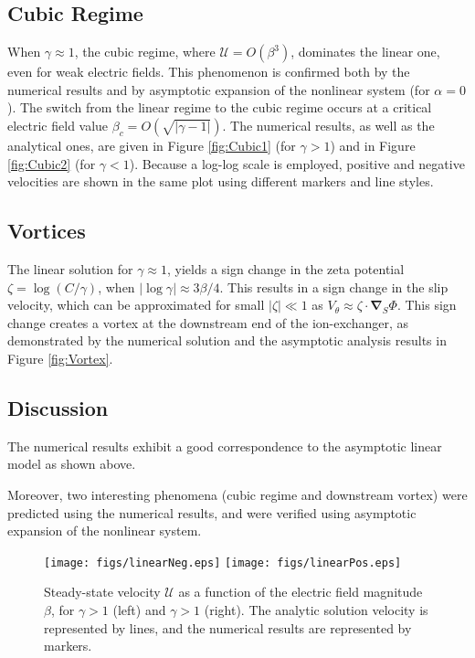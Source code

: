 \documentclass[10pt]{ijnam}
\newcommand\bnabla{\boldsymbol{\nabla}}
\newcommand\cU{\mathscr{U}}
\begin{document}
\subsection{Cubic Regime}
When $\gamma \approx 1$, the cubic regime, where $\cU = O(\beta^3)$, 
dominates the linear one, even for weak electric fields. 
This phenomenon is confirmed both by the numerical
results and by asymptotic expansion of the nonlinear system (for $\alpha=0$).
The switch from the linear regime to the cubic regime occurs at a critical electric
field value $\beta_c = O(\sqrt{|\gamma - 1|})$.
The numerical results, as well as the analytical ones, are given in Figure
\ref{fig:Cubic1} (for $\gamma > 1$) and in Figure \ref{fig:Cubic2} (for $\gamma < 1$).
Because a log-log scale is employed, positive and negative velocities are shown in
the same plot using different markers and line styles.

\subsection{Vortices}
The linear solution for $\gamma \approx 1$, 
yields a sign change in the zeta potential $\zeta = \log (C/\gamma)$, when
$|\log\gamma| \approx 3\beta / 4$. This results in a sign change in the slip velocity,
which can be approximated for small $|\zeta| \ll 1$ as $V_\theta \approx \zeta \cdot \bnabla_S \varPhi$.
This sign change creates a vortex at the downstream end of the ion-exchanger, 
as demonstrated by the numerical solution and the asymptotic analysis results 
in Figure \ref{fig:Vortex}.

\subsection{Discussion}
The numerical results exhibit a good correspondence to the asymptotic linear model as
shown above.

Moreover, two interesting phenomena (cubic regime and downstream vortex) were predicted
using the numerical results, and were verified using asymptotic expansion of the
nonlinear system.

\begin{figure}[htbp]
    \begin{center}
    \texttt{[image: figs/linearNeg.eps]}
    \texttt{[image: figs/linearPos.eps]}
    \caption{Steady-state velocity $\cU$ as a function of the 
        electric field magnitude $\beta$, for $\gamma > 1$ (left) 
        and $\gamma > 1$ (right). 
        The analytic solution velocity is represented by lines, and the numerical
        results are represented by markers.}
    \label{fig:Linear}
    \end{center}
\end{figure}
\end{document}
